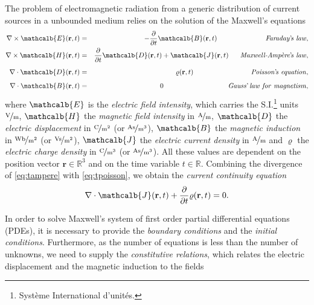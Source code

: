 \par The problem of electromagnetic radiation from a generic distribution of current sources in a unbounded medium relies on the solution of the Maxwell's equations \cite{rothwell2009electromagnetics}
\begin{eqnarray}
\nabla \times \mathcalb{E}(\mathbf{r},t) &= & -\frac{\partial}{\partial t}\mathcalb{B}(\mathbf{r},t) \qquad \qquad \qquad \quad \mathit{Faraday}\textrm{'}\mathit{\!s \ law}, \label{eq:tfaraday}  \\
\nabla \times \mathcalb{H}(\mathbf{r},t) &= & \frac{\partial}{\partial t}\mathcalb{D}(\mathbf{r},t) + \mathcalb{J}(\mathbf{r},t)  \quad \ \ \textit{Maxwell-Amp\`{e}re}\textrm{'}\mathit{\!s \ law}, \label{eq:tampere} \\[5pt]
\nabla \cdot \mathcalb{D}(\mathbf{r},t) &= & {\varrho}(\mathbf{r},t) \qquad \qquad \qquad \qquad \  \mathit{Poisson}\textrm{'}\mathit{\!s \ equation}, \label{eq:tpoisson}\\[5pt]
\nabla \cdot \mathcalb{B}(\mathbf{r},t) &= & 0 \qquad \qquad \qquad \qquad 	\ \ \ \ \mathit{Gauss}\textrm{'}\mathit{\! \ law \ for \ magnetism}, \label{eq:tgauss}
\end{eqnarray} where $\mathcalb{E}$ is the \textit{electric field intensity}, which carries the S.I.\footnote{Syst\`eme International d'unit\'es.} units $\mathrm{\nicefrac{\mathrm V}{\mathrm m}}$, $\mathcalb{H}$ the \textit{magnetic field intensity} in $\mathrm{\nicefrac{\mathrm A}{\mathrm m}}$, $\mathcalb{D}$ the \textit{electric displacement} in $\mathrm{\nicefrac{\mathrm C}{m^2}}$ (or $\mathrm{\nicefrac{\mathrm{As}}{m^3}}$), $\mathcalb{B}$ the \textit{magnetic induction} in $\mathrm{\nicefrac{\mathrm{Wb}}{m^2}}$ (or $\mathrm{\nicefrac{\mathrm{Vs}}{m^2}}$), $\mathcalb{J}$ the \textit{electric current density} in $\mathrm{\nicefrac{\mathrm A}{\mathrm m}}$ and $\mathcal{\varrho}$ the \textit{electric charge density} in $\mathrm{\nicefrac{\mathrm C}{m^3}}$ (or $\mathrm{\nicefrac{\mathrm{As}}{m^3}}$).
 All these values are dependent on the position vector $\mathbf{r} \in \mathbb{R}^3$ and on the time variable $t \in \mathbb{R}$. Combining the divergence of \eqref{eq:tampere} with \eqref{eq:tpoisson}, we obtain the \textit{current continuity equation}
\begin{equation}
\nabla \cdot \mathcalb{J}(\mathbf{r},t) + \frac{\partial}{\partial t} \mathcal{\varrho}(\mathbf{r},t) = 0.
\end{equation}
\par In order to solve Maxwell's system of first order partial differential equations (PDEs), it is necessary to provide the \textit{boundary conditions} and the \textit{initial conditions}. Furthermore, as the number of equations is less than the number of unknowns, we need to supply the \textit{constitutive relations}, which relates the electric displacement and the magnetic induction to the fields
